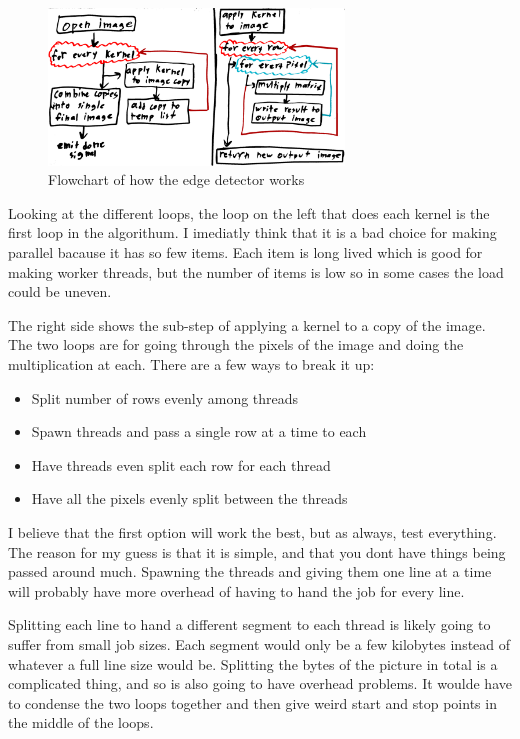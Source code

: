 \documentclass[12pt]{article}
\begin{document}
\begin{figure}[htb]
	\centering
	\includegraphics[width=0.7\textwidth]{edge_flowchart.png}
	\caption{Flowchart of how the edge detector works}
\end{figure}

Looking at the different loops, the loop on the left that does each kernel is the first loop in the algorithum.
I imediatly think that it is a bad choice for making parallel bacause it has so few items.
Each item is long lived which is good for making worker threads, but the number of items is low so in some cases the load could be uneven.

The right side shows the sub-step of applying a kernel to a copy of the image.
The two loops are for going through the pixels of the image and doing the multiplication at each.
There are a few ways to break it up:
\begin{itemize}
	\item Split number of rows evenly among threads
	\item Spawn threads and pass a single row at a time to each
	\item Have threads even split each row for each thread
	\item Have all the pixels evenly split between the threads
\end{itemize}

I believe that the first option will work the best, but as always, test everything.
The reason for my guess is that it is simple, and that you dont have things being passed around much.
Spawning the threads and giving them one line at a time will probably have more overhead of having to hand the job for every line.

Splitting each line to hand a different segment to each thread is likely going to suffer from small job sizes.
Each segment would only be a few kilobytes instead of whatever a full line size would be.
Splitting the bytes of the picture in total is a complicated thing, and so is also going to have overhead problems.
It woulde have to condense the two loops together and then give weird start and stop points in the middle of the loops.
\end{document}
